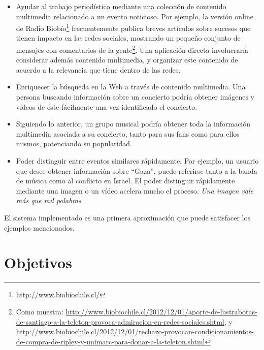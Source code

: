 \begin{itemize}
\item Ayudar al trabajo periodístico mediante una colección de
     contenido multimedia relacionado a un evento noticioso. Por
     ejemplo, la versión online de Radio
     Biobío\footnote{\href{http://www.biobiochile.cl/}{http://www.biobiochile.cl/} } frecuentemente publica
     breves artículos sobre sucesos que tienen impacto en las redes
     sociales, mostrando un pequeño conjunto de mensajes con
     comentarios de la gente\footnote{Como muestra: \href{http://www.biobiochile.cl/2012/12/01/aporte-de-lustrabotas-de-santiago-a-la-teleton-provoca-admiracion-en-redes-sociales.shtml}{http://www.biobiochile.cl/2012/12/01/aporte-de-lustrabotas-de-santiago-a-la-teleton-provoca-admiracion-en-redes-sociales.shtml}, y \href{http://www.biobiochile.cl/2012/12/01/rechazo-provocan-condicionamientos-de-compra-de-ripley-y-unimarc-para-donar-a-la-teleton.shtml}{http://www.biobiochile.cl/2012/12/01/rechazo-provocan-condicionamientos-de-compra-de-ripley-y-unimarc-para-donar-a-la-teleton.shtml} }.
     Una aplicación directa involucraría
     considerar además contenido multimedia, y organizar este
     contenido de acuerdo a la relevancia que tiene dentro de las
     redes.
\item Enriquecer la búsqueda en la Web a través de contenido
     multimedia. Una persona buscando información sobre un concierto
     podría obtener imágenes y vídeos de éste fácilmente una vez
     identificado el concierto.
\item Siguiendo lo anterior, un grupo musical podría obtener toda la
     información multimedia asociada a su concierto, tanto para sus
     fans como para ellos mismos, potenciando su popularidad.
\item Poder distinguir entre eventos similares rápidamente. Por
     ejemplo, un usuario que desee obtener información sobre ``Gaza'',
     puede referirse tanto a la banda de música como al conflicto en
     Israel. El poder distinguir rápidamente mediante una imagen o un
     vídeo acelera mucho el proceso. \emph{Una imagen vale más que mil palabras}.
\end{itemize}
   El sistema implementado es una primera aproximación que puede
   satisfacer los ejemplos mencionados.

\section{Objetivos}
\label{sec-1.2}

